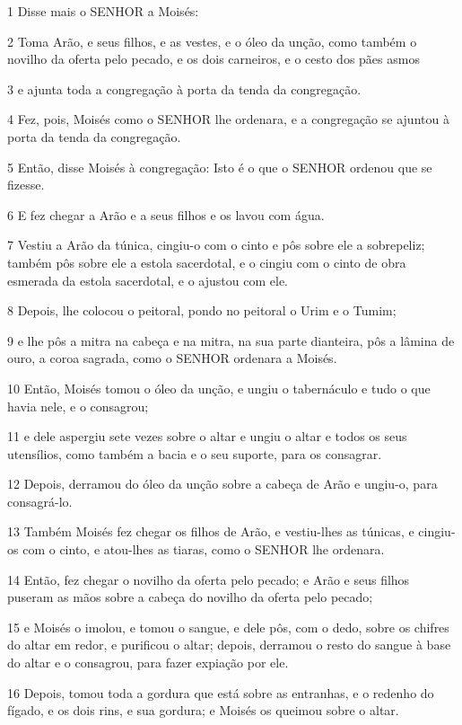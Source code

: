 \par 1 Disse mais o SENHOR a Moisés:
\par 2 Toma Arão, e seus filhos, e as vestes, e o óleo da unção, como também o novilho da oferta pelo pecado, e os dois carneiros, e o cesto dos pães asmos
\par 3 e ajunta toda a congregação à porta da tenda da congregação.
\par 4 Fez, pois, Moisés como o SENHOR lhe ordenara, e a congregação se ajuntou à porta da tenda da congregação.
\par 5 Então, disse Moisés à congregação: Isto é o que o SENHOR ordenou que se fizesse.
\par 6 E fez chegar a Arão e a seus filhos e os lavou com água.
\par 7 Vestiu a Arão da túnica, cingiu-o com o cinto e pôs sobre ele a sobrepeliz; também pôs sobre ele a estola sacerdotal, e o cingiu com o cinto de obra esmerada da estola sacerdotal, e o ajustou com ele.
\par 8 Depois, lhe colocou o peitoral, pondo no peitoral o Urim e o Tumim;
\par 9 e lhe pôs a mitra na cabeça e na mitra, na sua parte dianteira, pôs a lâmina de ouro, a coroa sagrada, como o SENHOR ordenara a Moisés.
\par 10 Então, Moisés tomou o óleo da unção, e ungiu o tabernáculo e tudo o que havia nele, e o consagrou;
\par 11 e dele aspergiu sete vezes sobre o altar e ungiu o altar e todos os seus utensílios, como também a bacia e o seu suporte, para os consagrar.
\par 12 Depois, derramou do óleo da unção sobre a cabeça de Arão e ungiu-o, para consagrá-lo.
\par 13 Também Moisés fez chegar os filhos de Arão, e vestiu-lhes as túnicas, e cingiu-os com o cinto, e atou-lhes as tiaras, como o SENHOR lhe ordenara.
\par 14 Então, fez chegar o novilho da oferta pelo pecado; e Arão e seus filhos puseram as mãos sobre a cabeça do novilho da oferta pelo pecado;
\par 15 e Moisés o imolou, e tomou o sangue, e dele pôs, com o dedo, sobre os chifres do altar em redor, e purificou o altar; depois, derramou o resto do sangue à base do altar e o consagrou, para fazer expiação por ele.
\par 16 Depois, tomou toda a gordura que está sobre as entranhas, e o redenho do fígado, e os dois rins, e sua gordura; e Moisés os queimou sobre o altar.
